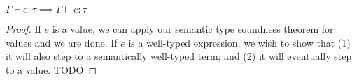 \begin{theorem}
$\Gamma \vdash e : \tau \implies \Gamma \vDash e : \tau$
\end{theorem}
\begin{proof}
  If $e$ is a value, we can apply our semantic type soundness theorem for values
  and we are done. If $e$ is a well-typed expression, we wish to show that (1)
  it will also step to a semantically well-typed term; and (2) it will
  eventually step to a value.
  TODO
\end{proof}


%
%
%
%

